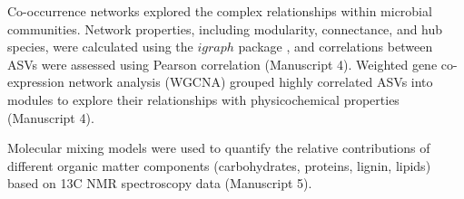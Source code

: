 Co-occurrence networks explored the complex relationships within microbial communities. Network properties, including modularity, connectance, and hub species, were calculated using the $igraph$ package \citep{Csardi2006}, and correlations between ASVs were assessed using Pearson correlation \citep{Harrell2019} (Manuscript 4). Weighted gene co-expression network analysis (WGCNA) grouped highly correlated ASVs into modules to explore their relationships with physicochemical properties \citep{Langfelder2008} (Manuscript 4).

Molecular mixing models were used to quantify the relative contributions of different organic matter components (carbohydrates, proteins, lignin, lipids) based on 13C NMR spectroscopy data \citep{Nelson2005,Prater2020} (Manuscript 5).
